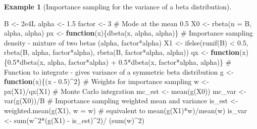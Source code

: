 \documentclass[
  11pt,
  letterpaper,
]{scrbook}
\newenvironment{Shaded}{\begin{snugshade}}{\end{snugshade}}
\newcommand{\AttributeTok}[1]{\textcolor[rgb]{0.40,0.45,0.13}{#1}}
\newcommand{\CommentTok}[1]{\textcolor[rgb]{0.37,0.37,0.37}{#1}}
\newcommand{\ControlFlowTok}[1]{\textcolor[rgb]{0.00,0.23,0.31}{\textbf{#1}}}
\newcommand{\DecValTok}[1]{\textcolor[rgb]{0.68,0.00,0.00}{#1}}
\newcommand{\FloatTok}[1]{\textcolor[rgb]{0.68,0.00,0.00}{#1}}
\newcommand{\FunctionTok}[1]{\textcolor[rgb]{0.28,0.35,0.67}{#1}}
\newcommand{\NormalTok}[1]{\textcolor[rgb]{0.00,0.23,0.31}{#1}}
\newcommand{\OtherTok}[1]{\textcolor[rgb]{0.00,0.23,0.31}{#1}}
\newcommand{\SpecialCharTok}[1]{\textcolor[rgb]{0.37,0.37,0.37}{#1}}
\theoremstyle{definition}
\newtheorem{example}{Example}[chapter]
\theoremstyle{plain}
\theoremstyle{plain}
\theoremstyle{plain}
\theoremstyle{definition}
\theoremstyle{definition}
\theoremstyle{plain}
\theoremstyle{plain}
\theoremstyle{remark}
\begin{document}
\begin{example}[Importance sampling for the variance of a beta
distribution]
\begin{Shaded}
\begin{Highlighting}[]
\NormalTok{B }\OtherTok{\textless{}{-}} \FloatTok{2e4}\NormalTok{L}
\NormalTok{alpha }\OtherTok{\textless{}{-}} \FloatTok{1.5}
\NormalTok{factor }\OtherTok{\textless{}{-}} \DecValTok{3}
\CommentTok{\# Mode at the mean 0.5}
\NormalTok{X0 }\OtherTok{\textless{}{-}} \FunctionTok{rbeta}\NormalTok{(}\AttributeTok{n =}\NormalTok{ B, alpha, alpha)}
\NormalTok{px }\OtherTok{\textless{}{-}} \ControlFlowTok{function}\NormalTok{(x)\{}\FunctionTok{dbeta}\NormalTok{(x, alpha, alpha)\}}
\CommentTok{\# Importance sampling density {-} mixture of two betas (alpha, factor*alpha)}
\NormalTok{X1 }\OtherTok{\textless{}{-}} \FunctionTok{ifelse}\NormalTok{(}\FunctionTok{runif}\NormalTok{(B) }\SpecialCharTok{\textless{}} \FloatTok{0.5}\NormalTok{, }\FunctionTok{rbeta}\NormalTok{(B, alpha, factor}\SpecialCharTok{*}\NormalTok{alpha), }\FunctionTok{rbeta}\NormalTok{(B, factor}\SpecialCharTok{*}\NormalTok{alpha, alpha))}
\NormalTok{qx }\OtherTok{\textless{}{-}} \ControlFlowTok{function}\NormalTok{(x)\{}\FloatTok{0.5}\SpecialCharTok{*}\FunctionTok{dbeta}\NormalTok{(x, alpha, factor}\SpecialCharTok{*}\NormalTok{alpha) }\SpecialCharTok{+} \FloatTok{0.5}\SpecialCharTok{*}\FunctionTok{dbeta}\NormalTok{(x, factor}\SpecialCharTok{*}\NormalTok{alpha, alpha)\}}
\CommentTok{\# Function to integrate {-} gives variance of a symmetric beta distribution}
\NormalTok{g }\OtherTok{\textless{}{-}} \ControlFlowTok{function}\NormalTok{(x)\{(x }\SpecialCharTok{{-}} \FloatTok{0.5}\NormalTok{)}\SpecialCharTok{\^{}}\DecValTok{2}\NormalTok{\}}
\CommentTok{\# Weights for importance sampling}
\NormalTok{w }\OtherTok{\textless{}{-}} \FunctionTok{px}\NormalTok{(X1)}\SpecialCharTok{/}\FunctionTok{qx}\NormalTok{(X1)}
\CommentTok{\# Monte Carlo integration}
\NormalTok{mc\_est }\OtherTok{\textless{}{-}} \FunctionTok{mean}\NormalTok{(}\FunctionTok{g}\NormalTok{(X0))}
\NormalTok{mc\_var }\OtherTok{\textless{}{-}} \FunctionTok{var}\NormalTok{(}\FunctionTok{g}\NormalTok{(X0))}\SpecialCharTok{/}\NormalTok{B}
\CommentTok{\# Importance sampling weighted mean and variance}
\NormalTok{is\_est }\OtherTok{\textless{}{-}} \FunctionTok{weighted.mean}\NormalTok{(}\FunctionTok{g}\NormalTok{(X1), }\AttributeTok{w =}\NormalTok{ w) }\CommentTok{\# equivalent to mean(g(X1)*w)/mean(w)}
\NormalTok{is\_var }\OtherTok{\textless{}{-}} \FunctionTok{sum}\NormalTok{(w}\SpecialCharTok{\^{}}\DecValTok{2}\SpecialCharTok{*}\NormalTok{(}\FunctionTok{g}\NormalTok{(X1) }\SpecialCharTok{{-}}\NormalTok{ is\_est)}\SpecialCharTok{\^{}}\DecValTok{2}\NormalTok{)}\SpecialCharTok{/}\NormalTok{ (}\FunctionTok{sum}\NormalTok{(w)}\SpecialCharTok{\^{}}\DecValTok{2}\NormalTok{)}

\end{Highlighting}
\end{Shaded}
\end{example}
\end{document}
